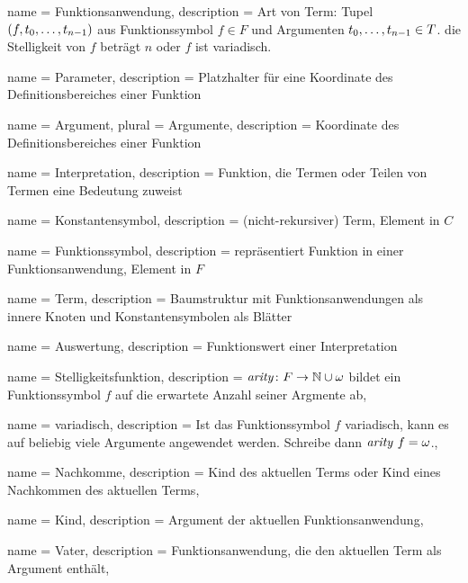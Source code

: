 

\makeglossaries

{
    name = {Funktionsanwendung},
    description = {Art von Term: Tupel $(f, {t}_{0}, \dots, {t}_{n-1})$ aus Funktionssymbol ${f \in F}$ und Argumenten ${{t}_{0}, \dots, {t}_{n-1} \in T}$. die Stelligkeit von $f$ beträgt $n$ oder $f$ ist variadisch.}
}

{
    name = Parameter,
    description = {Platzhalter für eine Koordinate des Definitionsbereiches einer Funktion}
}

{
    name = Argument,
    plural = Argumente,
    description = {Koordinate des Definitionsbereiches einer Funktion}
}

{
    name = Interpretation,
    description = {Funktion, die Termen oder Teilen von Termen eine Bedeutung zuweist}
}

{
    name = Konstantensymbol,
    description = {(nicht-rekursiver) Term, Element in $C$}
}

{
    name = Funktionssymbol,
    description = {repräsentiert Funktion in einer Funktionsanwendung, Element in $F$}
}

{
    name = Term,
    description = {Baumstruktur mit Funktionsanwendungen als innere Knoten und Konstantensymbolen als Blätter}
}

{
    name = Auswertung,
    description = {Funktionswert einer Interpretation}
}

{
    name = Stelligkeitsfunktion,
    description = {$\mathit{arity} \colon F \rightarrow \mathbb N \cup \omega$ bildet ein Funktionssymbol $f$ auf die erwartete Anzahl seiner Argmente ab},
}

{
    name = variadisch,
    description = {Ist das Funktionssymbol $f$ variadisch, kann es auf beliebig viele Argumente angewendet werden. Schreibe dann $\mathit{arity}~f = \omega$.},
}

{
    name = Nachkomme,
    description = {Kind des aktuellen Terms oder Kind eines Nachkommen des aktuellen Terms},
}

{
    name = Kind,
    description = {Argument der aktuellen Funktionsanwendung},
}


{
    name = Vater,
    description = {Funktionsanwendung, die den aktuellen Term als Argument enthält},
}

